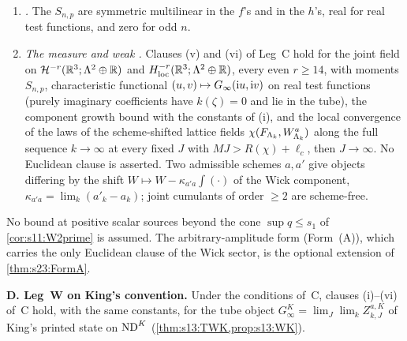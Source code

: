 \begin{theorem}
\begin{enumerate}[label=\textup{(\roman*)},leftmargin=*]
\item \emph{\OSth.} The $S_{n,p}$ are symmetric multilinear in the $f$'s and in the $h$'s, real for real test functions, and zero for odd $n$.
\item[\textup{(v),(vi)}] \emph{The measure and weak \OSf.} Clauses (v) and (vi) of Leg~C hold for the joint field on $\mathcal H^{-r}(\mathbb R^3;\Lambda^2\oplus\mathbb R)$ and $H^{-r}_{\rm loc}(\mathbb R^3;\Lambda^2\oplus\mathbb R)$, every even $r\ge14$, with moments $S_{n,p}$, characteristic functional $(u,v)\mapsto G_\infty(\mathrm iu,\mathrm iv)$ on real test functions (purely imaginary coefficients have $k(\zeta)=0$ and lie in the tube), the component growth bound with the constants of (i), and the local convergence of the laws of the scheme-shifted lattice fields $\chi(F_{\Lambda_k},W^a_{\Lambda_k})$ along the full sequence $k\to\infty$ at every fixed $J$ with $MJ>R(\chi)+\ell_c$, then $J\to\infty$. No Euclidean clause is asserted. Two admissible schemes $a,a'$ give objects differing by the shift $W\mapsto W-\kappa_{a'a}\int(\cdot)$ of the Wick component, $\kappa_{a'a}=\lim_k(a'_k-a_k)$; joint cumulants of order $\ge2$ are scheme-free.
\end{enumerate}
No bound at positive scalar sources beyond the cone $\sup q\le s_1$ of \cref{cor:s11:W2prime} is assumed. The arbitrary-amplitude form (Form~(A)), which carries the only Euclidean clause of the Wick sector, is the optional extension of \cref{thm:s23:FormA}.

\smallskip\noindent\textbf{D. Leg~W on King's convention.} Under the conditions of~C, clauses (i)--(vi) of~C hold, with the same constants, for the tube object $G^K_\infty=\lim_J\lim_kZ^{a,K}_{k,J}$ of King's printed state on $\mathrm{ND}^{K}$ (\cref{thm:s13:TWK,prop:s13:WK}).
\end{theorem}

